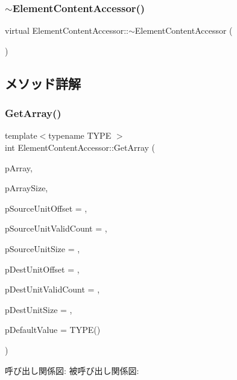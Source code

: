 \subsubsection{\texorpdfstring{$\sim$\+Element\+Content\+Accessor()}{~ElementContentAccessor()}}
{\footnotesize\ttfamily virtual Element\+Content\+Accessor\+::$\sim$\+Element\+Content\+Accessor (\begin{DoxyParamCaption}{ }\end{DoxyParamCaption})\hspace{0.3cm}{\ttfamily [virtual]}}



\subsection{メソッド詳解}
\mbox{\label{struct_element_content_accessor_a412f6cb46b068e160e393f4318bcf4fc}} 
\subsubsection{\texorpdfstring{Get\+Array()}{GetArray()}}
{\footnotesize\ttfamily template$<$typename T\+Y\+PE $>$ \\
int Element\+Content\+Accessor\+::\+Get\+Array (\begin{DoxyParamCaption}\item[{T\+Y\+PE $\ast$}]{p\+Array,  }\item[{int}]{p\+Array\+Size,  }\item[{int}]{p\+Source\+Unit\+Offset = {},  }\item[{int}]{p\+Source\+Unit\+Valid\+Count = {},  }\item[{int}]{p\+Source\+Unit\+Size = {},  }\item[{int}]{p\+Dest\+Unit\+Offset = {},  }\item[{int}]{p\+Dest\+Unit\+Valid\+Count = {},  }\item[{int}]{p\+Dest\+Unit\+Size = {},  }\item[{T\+Y\+PE}]{p\+Default\+Value = {\ttfamily TYPE()} }\end{DoxyParamCaption})}

呼び出し関係図\+:
被呼び出し関係図\+:
\mbox{\label{struct_element_content_accessor_a5c066a3db4f929723fc1a78c11745154}} 
